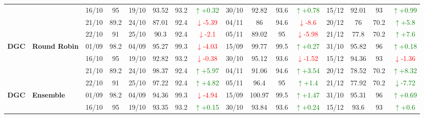 \documentclass{ieeeaccess}
\begin{document}
{\begin{longtable}{llcc|cccc|cccc|cccc}
&
& 16/10 & 95 & 19/10 & 93.52 & 93.2 & \textcolor{green}{\(\uparrow\)+0.32} & 30/10 & 92.82 & 93.6 & \textcolor{green}{\(\uparrow\)+0.78} & 15/12 & 92.01 & 93 & \textcolor{green}{\(\uparrow\)+0.99} \\

&
& 21/10 & 89.2 & 24/10 & 87.01 & 92.4 & \textcolor{red}{\(\downarrow\)-5.39} & 04/11 & 86 & 94.6 & \textcolor{red}{\(\downarrow\)-8.6} & 20/12 & 76 & 70.2 & \textcolor{green}{\(\uparrow\)+5.8} \\

&
& 22/10 & 91 & 25/10 & 90.3 & 92.4 & \textcolor{red}{\(\downarrow\)-2.1} & 05/11 & 89.02 & 95 & \textcolor{red}{\(\downarrow\)-5.98} & 21/12 & 77.8 & 70.2 & \textcolor{green}{\(\uparrow\)+7.6} \\
\midrule


\multirow{4}{*}{\textbf{DGC}} 
& \textbf{Round Robin}
& 01/09 & 98.2 & 04/09 & 95.27 & 99.3 & \textcolor{red}{\(\downarrow\)-4.03} & 15/09 & 99.77 & 99.5 & \textcolor{green}{\(\uparrow\)+0.27} & 31/10 & 95.82 & 96 & \textcolor{green}{\(\uparrow\)+0.18} \\

&
& 16/10 & 95 & 19/10 & 92.82 & 93.2 & \textcolor{red}{\(\downarrow\)-0.38} & 30/10 & 95.12 & 93.6 & \textcolor{red}{\(\downarrow\)-1.52} & 15/12 & 94.36 & 93 & \textcolor{red}{\(\downarrow\)-1.36} \\

&
& 21/10 & 89.2 & 24/10 & 98.37 & 92.4 & \textcolor{green}{\(\uparrow\)+5.97} & 04/11 & 91.06 & 94.6 & \textcolor{green}{\(\uparrow\)+3.54} & 20/12 & 78.52 & 70.2 & \textcolor{green}{\(\uparrow\)+8.32} \\

&
& 22/10 & 91 & 25/10 & 97.22 & 92.4 & \textcolor{green}{\(\uparrow\)+4.82} & 05/11 & 96.4 & 95 & \textcolor{green}{\(\uparrow\)+1.4} & 21/12 & 77.92 & 70.2 & \textcolor{green}{\(\downarrow\)-7.72} \\
\midrule


\multirow{4}{*}{\textbf{DGC}} 
& \textbf{Ensemble}
& 01/09 & 98.2 & 04/09 & 94.36 & 99.3 & \textcolor{red}{\(\downarrow\)-4.94} & 15/09 & 100.97 & 99.5 & \textcolor{green}{\(\uparrow\)+1.47} & 31/10 & 95.31 & 96 & \textcolor{green}{\(\uparrow\)+0.69} \\

&
& 16/10 & 95 & 19/10 & 93.35 & 93.2 & \textcolor{green}{\(\uparrow\)+0.15} & 30/10 & 93.84 & 93.6 & \textcolor{green}{\(\uparrow\)+0.24} & 15/12 & 93.6 & 93 & \textcolor{green}{\(\uparrow\)+0.6} \\


\end{longtable}}
\end{document}

